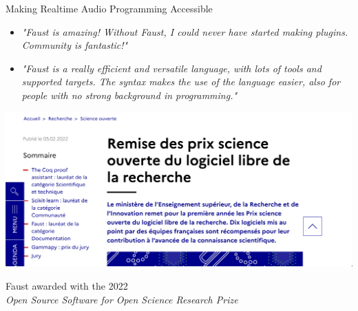 
\begin{frame}[fragile]{Making Realtime Audio Programming Accessible}

    \begin{itemize}
        \item \emph{"Faust is amazing! Without Faust, I could never have started making plugins. Community is fantastic!"} 
        \item \emph{"Faust is a really efficient and versatile language, with lots of tools and supported targets. The syntax makes the use of the language easier, also for people with no strong background in programming."}
    \end{itemize}

    \begin{center}
        \includegraphics[height=0.25\textheight]{images/prix-faust.png}

		Faust awarded with the 2022\\\emph{Open Source Software for Open Science Research Prize}
    \end{center}

\end{frame}
